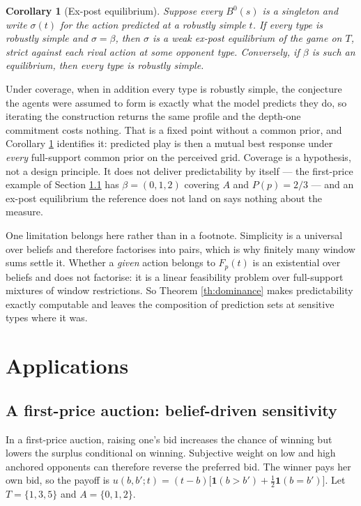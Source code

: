 \documentclass[12pt]{article}
\newtheorem{corollary}{Corollary}
\theoremstyle{definition}
\begin{document}
\begin{corollary}[Ex-post equilibrium]\label{cor:expost}
Suppose every $B^0(s)$ is a singleton and write $\sigma(t)$ for the action predicted at a robustly simple $t$. If every type is robustly simple and $\sigma = \beta$, then $\sigma$ is a weak ex-post equilibrium of the game on $T$, strict against each rival action at some opponent type. Conversely, if $\beta$ is such an equilibrium, then every type is robustly simple.
\end{corollary}

Under coverage, when in addition every type is robustly simple, the conjecture the agents were assumed to form is exactly what the model predicts they do, so iterating the construction returns the same profile and the depth-one commitment costs nothing. That is a fixed point without a common prior, and Corollary \ref{cor:expost} identifies it: predicted play is then a mutual best response under \emph{every} full-support common prior on the perceived grid. Coverage is a hypothesis, not a design principle. It does not deliver predictability by itself --- the first-price example of Section \ref{sec:fpa} has $\beta = (0,1,2)$ covering $A$ and $P(p) = 2/3$ --- and an ex-post equilibrium the reference does not land on says nothing about the measure.

One limitation belongs here rather than in a footnote. Simplicity is a universal over beliefs and therefore factorises into pairs, which is why finitely many window sums settle it. Whether a \emph{given} action belongs to $F_p(t)$ is an existential over beliefs and does not factorise: it is a linear feasibility problem over full-support mixtures of window restrictions. So Theorem \ref{th:dominance} makes predictability exactly computable and leaves the composition of prediction sets at sensitive types where it was.

\section{Applications}\label{sec:examples}

\subsection{A first-price auction: belief-driven sensitivity}\label{sec:fpa}

In a first-price auction, raising one's bid increases the chance of winning but lowers the surplus conditional on winning. Subjective weight on low and high anchored opponents can therefore reverse the preferred bid. The winner pays her own bid, so the payoff is $u(b, b'; t) = (t - b)\bigl[\mathbf{1}(b > b') + \tfrac12 \mathbf{1}(b = b')\bigr]$. Let $T = \{1, 3, 5\}$ and $A = \{0, 1, 2\}$.
\end{document}
